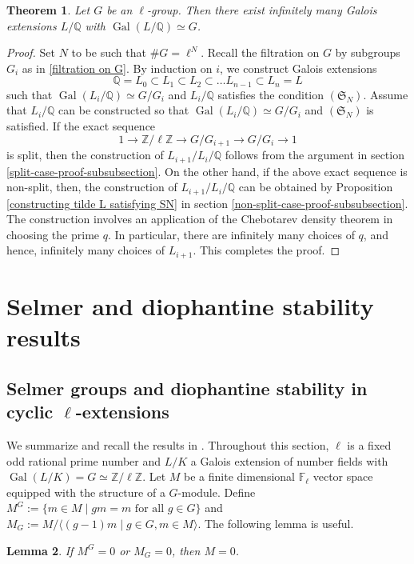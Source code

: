 \documentclass[11pt,reqno]{amsart}
\newtheorem{theorem}{Theorem}[section]
\newtheorem{lemma}[theorem]{Lemma}
\newcommand{\Z}{\mathbb{Z}}
\newcommand{\Q}{\mathbb{Q}}
\newcommand{\F}{\mathbb{F}}
\newcommand{\op}[1]{\operatorname{#1}}
\numberwithin{equation}{section}
\begin{document}
\begin{theorem}
    Let $G$ be an $\ell$-group. Then there exist infinitely many Galois extensions $L/\Q$ with $\op{Gal}(L/\Q)\simeq G$. 
\end{theorem}
\begin{proof}
    Set $N$ to be such that $\# G=\ell^N$. Recall the filtration on $G$ by subgroups $G_i$ as in \eqref{filtration on G}. By induction on $i$, we construct Galois extensions
\[\Q=L_0\subset L_1\subset L_2\subset \dots L_{n-1}\subset L_n=L\] such that $\op{Gal}(L_i/\Q)\simeq G/G_i$ and $L_i/\Q$ satisfies the condition $(\mathfrak{S}_N)$. Assume that $L_i/\Q$ can be constructed so that $\op{Gal}(L_i/\Q)\simeq G/G_i$ and $(\mathfrak{S}_N)$ is satisfied. If the exact sequence
\[1\rightarrow \Z/\ell \Z\rightarrow G/G_{i+1}\rightarrow G/G_i\rightarrow 1\] is split, then the construction of $L_{i+1}/L_i/\Q$ follows from the argument in section \ref{split-case-proof-subsubsection}. On the other hand, if the above exact sequence is non-split, then, the construction of $L_{i+1}/L_i/\Q$ can be obtained by Proposition \ref{constructing tilde L satisfying SN} in section \ref{non-split-case-proof-subsubsection}. The construction involves an application of the Chebotarev density theorem in choosing the prime $q$. In particular, there are infinitely many choices of $q$, and hence, infinitely many choices of $L_{i+1}$. This completes the proof.
\end{proof}
\section{Selmer and diophantine stability results}\label{s 3}
\subsection{Selmer groups and diophantine stability in cyclic $\ell$-extensions}
\par We summarize and recall the results in \cite[section 2]{pathakray}. Throughout this section, $\ell$ is a fixed odd rational prime number and $L/K$ a Galois extension of number fields with $\op{Gal}(L/K)=G\simeq \Z/\ell\Z$. Let $M$ be a finite dimensional $\F_\ell$ vector space equipped with the structure of a $G$-module. Define \( M^G := \{m \in M \mid gm = m \text{ for all } g \in G\} \) and \( M_G := M / \langle (g-1)m \mid g \in G, m \in M \rangle \). The following lemma is useful.

\begin{lemma}\label{NSW lemma}
If \( M^G = 0 \) or \( M_G = 0 \), then \( M = 0 \).
\end{lemma}
\end{document}
